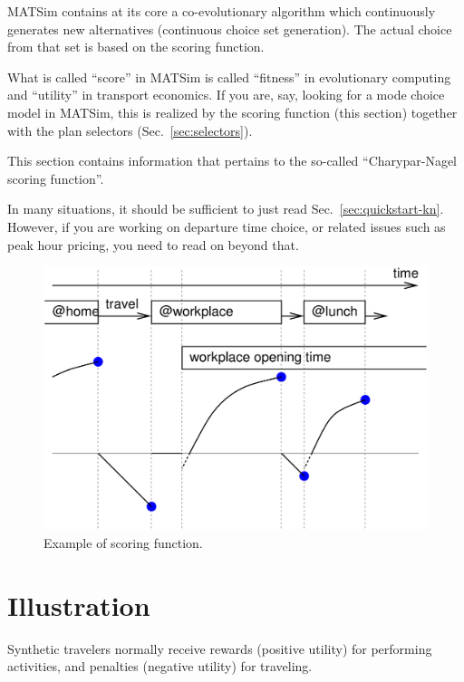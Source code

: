
\def\betaperf{\beta_{\it perf}}

\begin{chapter-intro}
MATSim contains at its core a co-evolutionary algorithm which continuously generates new alternatives (continuous choice set generation).  The actual choice from that set is based on the scoring function.
\end{chapter-intro}

\begin{note}
What is called ``score'' in MATSim is called ``fitness'' in evolutionary computing and ``utility'' in transport economics.  If you are, say, looking for a mode choice model in MATSim, this is realized by the scoring function (this section) together with the plan selectors (Sec.~\ref{sec:selectors}).
\end{note}

This section contains information that pertains to the so-called ``Charypar-Nagel scoring function''.

In many situations, it should be sufficient to just read Sec.~\ref{sec:quickstart-kn}.  However, if you are working on departure time choice, or related issues such as peak hour pricing, you need to read on beyond that.

\umbruch

\begin{figure}[h]
\centerline{%
\includegraphics[width=0.6\hsize]{figures/scoringFunction/scoring-example-wo-marginal}
}
\caption{Example of scoring function.}
\label{fig:scoring-example-wo-marginal}
\end{figure}

\section{Illustration}

Synthetic travelers normally receive rewards (positive utility) for performing activities, and penalties (negative utility) for traveling.

